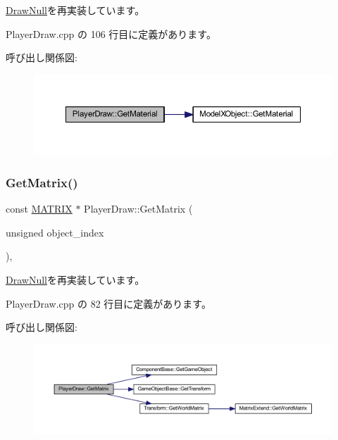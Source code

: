 \mbox{\hyperlink{class_draw_null_a84969d22d3436986f214e9896fe44fc6}{Draw\+Null}}を再実装しています。



 Player\+Draw.\+cpp の 106 行目に定義があります。

呼び出し関係図\+:\nopagebreak
\begin{figure}[H]
\begin{center}
\leavevmode
\includegraphics[width=350pt]{class_player_draw_ae818d3adaf5120845c2a78c230b5365e_cgraph}
\end{center}
\end{figure}
\mbox{\label{class_player_draw_a8edf1441ea23f298c6a0ca707f54021a}} 
\subsubsection{\texorpdfstring{Get\+Matrix()}{GetMatrix()}}
{\footnotesize\ttfamily const \mbox{\hyperlink{_vector3_d_8h_a032295cd9fb1b711757c90667278e744}{M\+A\+T\+R\+IX}} $\ast$ Player\+Draw\+::\+Get\+Matrix (\begin{DoxyParamCaption}\item[{unsigned}]{object\+\_\+index }\end{DoxyParamCaption})\hspace{0.3cm}{\ttfamily [override]}, {\ttfamily [virtual]}}



\mbox{\hyperlink{class_draw_null_adede079e9c11a756090740b20bb43022}{Draw\+Null}}を再実装しています。



 Player\+Draw.\+cpp の 82 行目に定義があります。

呼び出し関係図\+:\nopagebreak
\begin{figure}[H]
\begin{center}
\leavevmode
\includegraphics[width=350pt]{class_player_draw_a8edf1441ea23f298c6a0ca707f54021a_cgraph}
\end{center}
\end{figure}
\mbox{\label{class_player_draw_ad9e2e09a32c7474fcea5e7e24e22bc71}} 
